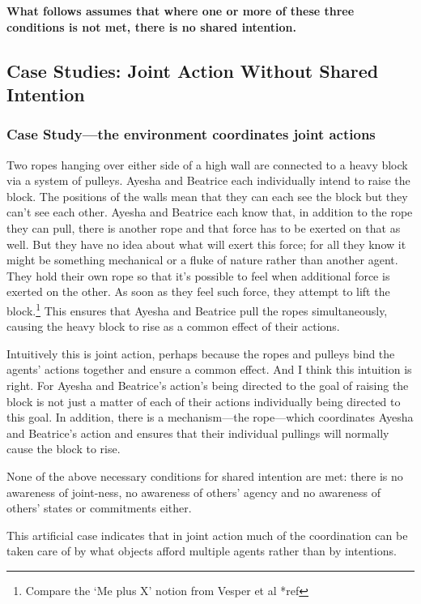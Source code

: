 \documentclass[14pt,a4paper]{extarticle}
\begin{document}
\textbf{What follows assumes that where one or more of these three conditions is not met, there is no shared intention.}

\subsection{Case Studies: Joint Action Without Shared Intention}


\subsubsection{Case Study---the environment coordinates joint actions}

Two ropes hanging over either side of a high wall are connected to a heavy block via a system of pulleys.  Ayesha and Beatrice each individually intend to raise the block.  
The positions of the walls mean that they can each see the block but they can't see each other.
Ayesha and Beatrice each know that, in addition to the rope they can pull, there is another rope and that force has to be exerted on that as well.  
But they have no idea about what will exert this force; for all they know it might be something mechanical or a fluke of nature rather than another agent.
They hold their own rope so that it's possible to feel when additional force is exerted on the other.  As soon as they feel such force, they attempt to lift the block.\footnote{
Compare the `Me plus X' notion from Vesper et al *ref
} 
This ensures that Ayesha and Beatrice pull the ropes simultaneously, causing the heavy block to rise as a common effect of their actions. 

Intuitively this is joint action, perhaps because the ropes and pulleys bind the agents' actions together and ensure a common effect.  
And I think this intuition is right.  For Ayesha and Beatrice's action's being directed to the goal of raising the block is not just a matter of each of their actions individually being directed to this goal.
In addition, there is a mechanism---the rope---which coordinates Ayesha and Beatrice's action and ensures that their individual pullings will normally cause the block to rise.  

None of the above necessary conditions for shared intention are met: there is no awareness of joint-ness, no awareness of others' agency and no awareness of others' states or commitments either.  

This artificial case indicates that in joint action much of the coordination can be taken care of by what objects afford multiple agents rather than by intentions. 
\end{document}
